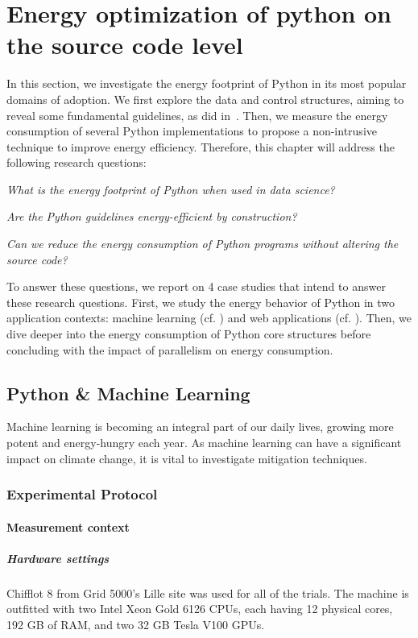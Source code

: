 \section{Energy optimization of python on the source code level}\label{python:sec_insights}
In this section, we investigate the energy footprint of Python in its most popular domains of adoption.
We first explore the data and control structures, aiming to reveal some fundamental guidelines, as \citeauthor{hasan_energy_2016} did in~\cite{hasan_energy_2016}.
Then, we measure the energy consumption of several Python implementations to propose a non-intrusive technique to improve energy efficiency.
Therefore, this chapter will address the following research questions:
\begin{compactenum}[\indent\bf RQ\,1:]
    \item \emph{What is the energy footprint of Python when used in data science?}
    \item \emph{Are the Python guidelines energy-efficient by construction?}
    \item \emph{Can we reduce the energy consumption of Python programs without altering the source code?}
\end{compactenum}

To answer these questions, we report on 4 case studies that intend to answer these research questions.
First, we study the energy behavior of Python in two application contexts: machine learning (cf. ) and web applications (cf. ).
Then, we dive deeper into the energy consumption of Python core structures before concluding with the impact of parallelism on energy consumption.


\subsection{Python \& Machine Learning}\label{sec:ml}
Machine learning is becoming an integral part of our daily lives, growing more potent and energy-hungry each year.
As machine learning can have a significant impact on climate change, it is vital to investigate mitigation techniques.
\subsubsection{Experimental Protocol}
\paragraph{Measurement context}
\subparagraph{Hardware settings}
Chifflot 8 from Grid 5000's Lille site was used for all of the trials.
The machine is outfitted with two Intel Xeon Gold 6126 CPUs, each having 12 physical cores, 192 GB of RAM, and two 32 GB Tesla V100 GPUs.

